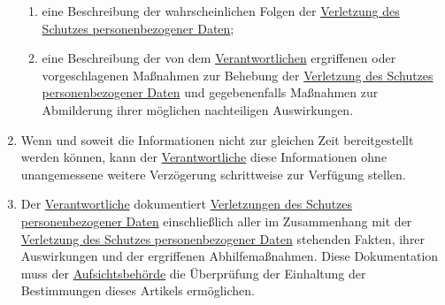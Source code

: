 \begin{enumerate}
\begin{enumerate}
    \item eine Beschreibung der wahrscheinlichen Folgen der \hyperref[itm:04-12]{Verletzung des Schutzes
     personenbezogener Daten};%
    \label{itm:33-3c}

    \item eine Beschreibung der von dem \hyperref[itm:04-7]{Verantwortlichen} ergriffenen oder vorgeschlagenen Maßnahmen
     zur Behebung der
     \hyperref[itm:04-12]{Verletzung des Schutzes personenbezogener Daten} und gegebenenfalls Maßnahmen zur Abmilderung
      ihrer möglichen nachteiligen Auswirkungen.%
    \label{itm:33-3d}

  \end{enumerate}

  \item Wenn und soweit die Informationen nicht zur gleichen Zeit bereitgestellt werden können, kann der \hyperref
   [itm:04-7]{Verantwortliche} diese Informationen ohne unangemessene weitere Verzögerung schrittweise zur Verfügung
   stellen.%
  \label{itm:33-4}

  \item Der \hyperref[itm:04-7]{Verantwortliche} dokumentiert \hyperref[itm:04-12]{Verletzungen des Schutzes
   personenbezogener Daten} einschließlich aller im Zusammenhang mit der \hyperref[itm:04-12]{Verletzung des Schutzes
   personenbezogener Daten} stehenden Fakten, ihrer Auswirkungen und der ergriffenen Abhilfemaßnahmen. Diese
   Dokumentation muss der \hyperref[itm:04-21]{Aufsichtsbehörde} die Überprüfung der Einhaltung der Bestimmungen dieses
   Artikels ermöglichen.%
  \label{itm:33-5}

\end{enumerate}


